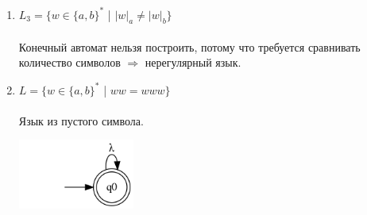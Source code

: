 \documentclass{article}
\begin{document}
\begin{enumerate}
\item {$L_3 = \{ w \in \{a,b\}^*  $ | $  |w|_a \neq |w|_b \} $} \\ \\
Конечный автомат нельзя построить, потому что требуется сравнивать количество символов $\Rightarrow$ нерегулярный язык.

\item {$L = \{ w \in \{a,b\}^*  $ | $ w w = w w w \}$} \\ \\
Язык из пустого символа.
\begin{center}
    \includegraphics[width=0.3\textwidth]{g14.png}
\end{center}
\end{enumerate}





\end{document}
